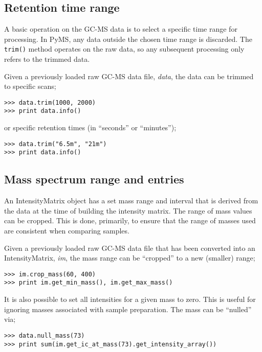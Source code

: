 \subsection{Retention time range}


A basic operation on the GC-MS data is to select a specific time range for
processing. In PyMS, any data outside the chosen time range is discarded. The
{\tt trim()} method operates on the raw data, so any subsequent processing only
refers to the trimmed data.

Given a previously loaded raw GC-MS data file, {\em data}, the data can be
trimmed to specific scans;

\begin{verbatim}
>>> data.trim(1000, 2000)
>>> print data.info()
\end{verbatim}

\noindent
or specific retention times (in ``seconds'' or ``minutes'');
\begin{verbatim}
>>> data.trim("6.5m", "21m")
>>> print data.info()
\end{verbatim}

\subsection{Mass spectrum range and entries}


An IntensityMatrix object has a set mass range and interval that is derived
from the data at the time of building the intensity matrix. The range of mass
values can be cropped. This is done, primarily, to ensure that the range of
masses used are consistent when comparing samples.

Given a previously loaded raw GC-MS data file that has been converted into an
IntensityMatrix, {\em im}, the mass range can be ``cropped'' to a new (smaller)
range;

\begin{verbatim}
>>> im.crop_mass(60, 400)
>>> print im.get_min_mass(), im.get_max_mass()
\end{verbatim}

It is also possible to set all intensities for a given mass to zero. This is
useful for ignoring masses associated with sample preparation. The mass can be
``nulled'' via;

\begin{verbatim}
>>> data.null_mass(73)
>>> print sum(im.get_ic_at_mass(73).get_intensity_array())
\end{verbatim}

